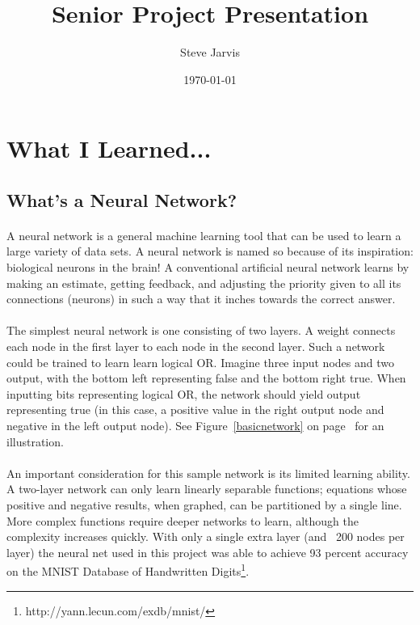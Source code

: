 \documentclass{article}
\title{Senior Project Presentation}
\author{Steve Jarvis}
\date{\today}
\begin{document}
\maketitle

\section{What I Learned...}

\subsection{What's a Neural Network?}

    \paragraph{}A neural network is a general machine learning tool that can be 
    used to learn a large variety of data sets. A neural network is named so 
    because of its inspiration: biological neurons in the brain! A conventional
    artificial neural network learns by making an estimate, getting feedback, and 
    adjusting the priority given to all its connections (neurons) in such a way 
    that it inches towards the correct answer.

    \paragraph{}The simplest neural network is one consisting of two layers. A 
    weight connects each node in the first layer to each node in the second layer.
    Such a network could be trained to learn learn logical OR. Imagine three input 
    nodes and two output, with the bottom left representing false and the bottom 
    right true. When inputting bits representing logical OR, the network should 
    yield output representing true (in this case, a positive value in the right
    output node and negative in the left output node). See 
    Figure~\ref{basicnetwork} on  page~\pageref{basicnetwork} for an 
    illustration.

    \paragraph{}An important consideration for this sample network is its limited 
    learning ability. A two-layer network can only learn linearly separable 
    functions; equations whose positive and negative results, when graphed, can 
    be partitioned by a single line. More complex functions require deeper networks
    to learn, although the complexity increases quickly. With only a single extra 
    layer (and ~200 nodes per layer) the neural net used in this project was able 
    to achieve 93 percent accuracy on the MNIST Database of Handwritten 
    Digits\footnote{http://yann.lecun.com/exdb/mnist/}.
\end{document}
